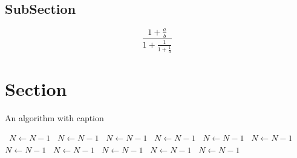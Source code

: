 \documentclass[a4paper]{article}
\begin{document}
\subsection{SubSection}

\[ \frac{1+\frac{a}{b}}{1+\frac{1}{1+\frac{1}{a}}} \]

\section{Section}

\begin{algorithm}
\caption{An algorithm with caption}
\begin{algorithmic}
\    \State $N \gets N - 1$
\    \State $N \gets N - 1$
\    \State $N \gets N - 1$
\    \State $N \gets N - 1$
\    \State $N \gets N - 1$
\    \State $N \gets N - 1$
\    \State $N \gets N - 1$
\    \State $N \gets N - 1$
\    \State $N \gets N - 1$
\    \State $N \gets N - 1$
\    \State $N \gets N - 1$
\EndWhile
\end{algorithmic}
\end{algorithm}
\end{document}
